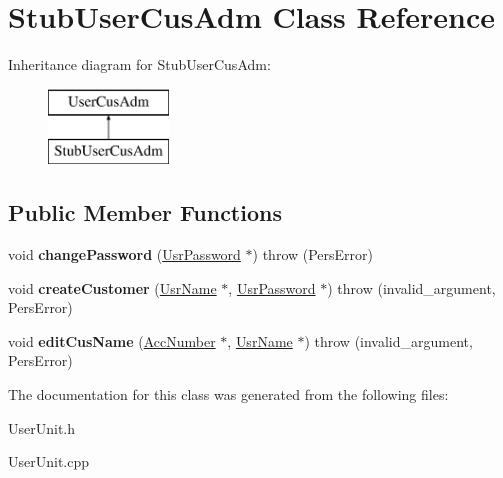 \hypertarget{classStubUserCusAdm}{\section{Stub\-User\-Cus\-Adm Class Reference}
\label{d1/d9d/classStubUserCusAdm}
}
Inheritance diagram for Stub\-User\-Cus\-Adm\-:\begin{figure}[H]
\begin{center}
\leavevmode
\includegraphics[height=2.000000cm]{d1/d9d/classStubUserCusAdm}
\end{center}
\end{figure}
\subsection*{Public Member Functions}
\begin{DoxyCompactItemize}
\item 
\hypertarget{classStubUserCusAdm_a7e44bec3dc4fb0640e6eb418dd8e8320}{void {\bfseries change\-Password} (\hyperlink{classUsrPassword}{Usr\-Password} $\ast$)  throw (\-Pers\-Error)}\label{d1/d9d/classStubUserCusAdm_a7e44bec3dc4fb0640e6eb418dd8e8320}

\item 
\hypertarget{classStubUserCusAdm_a53dc0deb3cf26a09c2814504b0daab63}{void {\bfseries create\-Customer} (\hyperlink{classUsrName}{Usr\-Name} $\ast$, \hyperlink{classUsrPassword}{Usr\-Password} $\ast$)  throw (invalid\-\_\-argument, Pers\-Error)}\label{d1/d9d/classStubUserCusAdm_a53dc0deb3cf26a09c2814504b0daab63}

\item 
\hypertarget{classStubUserCusAdm_a84ca3047ccb0ac2e371a23c4e4fcdba0}{void {\bfseries edit\-Cus\-Name} (\hyperlink{classAccNumber}{Acc\-Number} $\ast$, \hyperlink{classUsrName}{Usr\-Name} $\ast$)  throw (invalid\-\_\-argument, Pers\-Error)}\label{d1/d9d/classStubUserCusAdm_a84ca3047ccb0ac2e371a23c4e4fcdba0}

\end{DoxyCompactItemize}


The documentation for this class was generated from the following files\-:\begin{DoxyCompactItemize}
\item 
User\-Unit.\-h\item 
User\-Unit.\-cpp\end{DoxyCompactItemize}
